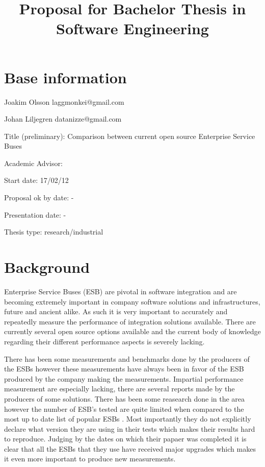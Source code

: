 \documentclass[10pt,a4paper]{proposal}
\title{Proposal for Bachelor Thesis in Software Engineering}
\begin{document}
\maketitle
\thispagestyle{fancy}


\section*{Base information}

Joakim Olsson laggmonkei@gmail.com

Johan Liljegren datanizze@gmail.com

Title (preliminary): Comparison between current open source Enterprise Service Buses

Academic Advisor:  

Start date: 17/02/12

Proposal ok by date: -

Presentation date: -


Thesis type: research\slash industrial


\section*{Background}


Enterprise Service Buses (ESB) \cite{falko07} are pivotal in software integration and are becoming extremely important in company software solutions and infrastructures, future and ancient alike. \cite{fenner03}
As such it is very important to accurately and repeatedly measure the performance of integration solutions available. 
There are currently several open source options available \cite{mehta11} and the current body of knowledge regarding their different performance aspects is severely lacking. 


There has been some measurements and benchmarks done by the producers of the ESBs however these measurements have always been in favor of the ESB produced by the company making the measurements. 
Impartial performance measurement are especially lacking, there are several reports made by the producers of some solutions. \cite{Perera07,mulevsjboss,mulevsglassfish,mulevsservicemix,mulesoft08}
There has been some reasearch done in the area \cite{ESBthesis} however the number of ESB's tested are quite limited when compared to the most up to date list of popular ESBs \cite{mehta11}.
Most importantly they do not explicitly declare what version they are using in their tests which makes their results hard to reproduce. 
Judging by the dates on which their papaer was completed it is clear that all the ESBs that they use have received major upgrades which makes it even more important to produce new measurements.
\end{document}
